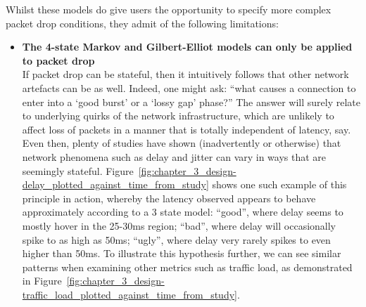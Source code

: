 \newpage

Whilst these models do give users the opportunity to specify more complex packet drop conditions, they admit of the
following limitations:
\begin{itemize}
    \item \textbf{The 4-state Markov and Gilbert-Elliot models can only be applied to packet drop} \\
    If packet drop can be stateful, then it intuitively follows that other network artefacts can be as well. Indeed,
    one might ask: ``what causes a connection to enter into a `good burst' or a `lossy gap' phase?'' The answer will
    surely relate to underlying quirks of the network infrastructure, which are unlikely to affect loss of packets in
    a manner that is totally independent of latency, say. Even then, plenty of studies have shown (inadvertently or
    otherwise) that network phenomena such as delay and jitter can vary in ways that are seemingly
    stateful\cite{hpbn_mobile_networks, a_close_examination_of_4G_lte_networks,
        gsma_4G_5G_experience_evaluation_guideline, mobile_broadband_networks_under_mobility,
        emulating_3G_4G_networks, study_on_quality_of_service_in_4G_and_5G_networks,
        speed_test_russian_4G_LTE_internet_provider_Beeline}.
    Figure~\ref{fig:chapter_3_design-delay_plotted_against_time_from_study} shows one such example of this principle
    in action, whereby the latency observed appears to behave approximately according to a 3 state model: ``good'',
    where delay seems to mostly hover in the 25-30ms region; ``bad'', where delay will occasionally spike to as high
    as 50ms; ``ugly'', where delay very rarely spikes to even higher than 50ms. To illustrate this hypothesis
    further, we can see similar patterns when examining other metrics such as traffic load, as demonstrated in
    Figure~\ref{fig:chapter_3_design-traffic_load_plotted_against_time_from_study}. \\ \\


\end{itemize}
